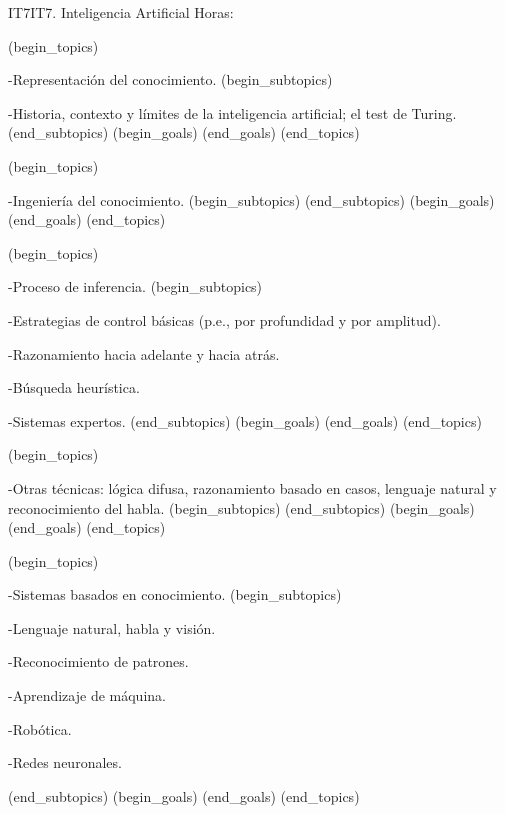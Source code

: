 \begin{BKL2}{IT7}{IT7. Inteligencia Artificial}
Horas:
 
(begin_topics)

-Representación del conocimiento.
(begin_subtopics)

-Historia, contexto y límites de la inteligencia artificial; el test de Turing.
(end_subtopics)
(begin_goals)
(end_goals)
(end_topics)

 

(begin_topics)

-Ingeniería del conocimiento.
(begin_subtopics)
(end_subtopics)
(begin_goals)
(end_goals)
(end_topics)

 

(begin_topics)

-Proceso de inferencia.
(begin_subtopics)

-Estrategias de control básicas (p.e., por profundidad y por amplitud).

-Razonamiento hacia adelante y hacia atrás.

-Búsqueda heurística.

-Sistemas expertos.
(end_subtopics)
(begin_goals)
(end_goals)
(end_topics)

 

(begin_topics)

-Otras técnicas: lógica difusa, razonamiento basado en casos, lenguaje natural y reconocimiento del habla.
(begin_subtopics)
(end_subtopics)
(begin_goals)
(end_goals)
(end_topics)

 

(begin_topics)

-Sistemas basados en conocimiento.
(begin_subtopics)

-Lenguaje natural, habla y visión.

-Reconocimiento de patrones.

-Aprendizaje de máquina.

-Robótica.

-Redes neuronales.

(end_subtopics)
(begin_goals)
(end_goals)
(end_topics)

\end{BKL2}



